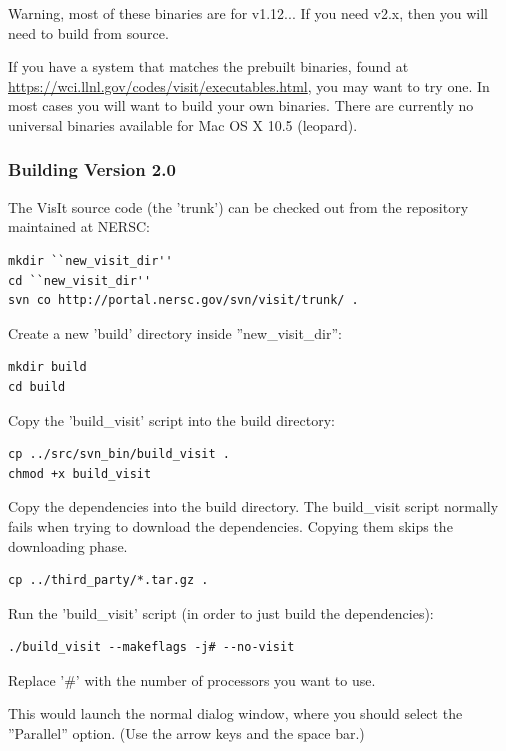 \documentclass[12pt]{article}
\begin{document}
Warning, most of these binaries are for v1.12... If you need v2.x, then you
will need to build from source.

If you have a system that matches the prebuilt binaries, found at
\url{https://wci.llnl.gov/codes/visit/executables.html}, you may want
to try one. In most cases you will want to build your own
binaries. There are currently no universal binaries available for Mac
OS X 10.5 (leopard).

\subsubsection{Building Version 2.0}
\label{subsec:VisItVersion2_Build}

The VisIt source code (the 'trunk') can be checked out from the
repository maintained at NERSC:

\begin{verbatim}
mkdir ``new_visit_dir''
cd ``new_visit_dir'' 
svn co http://portal.nersc.gov/svn/visit/trunk/ .
\end{verbatim}

Create a new 'build' directory inside ''new\_visit\_dir'':

\begin{verbatim}
mkdir build
cd build
\end{verbatim}

Copy the 'build\_visit' script into the build directory:

\begin{verbatim}
cp ../src/svn_bin/build_visit .
chmod +x build_visit
\end{verbatim}

Copy the dependencies into the build directory. The build\_visit script
normally fails when trying to download the dependencies.  Copying them
skips the downloading phase.

\begin{verbatim}
cp ../third_party/*.tar.gz .
\end{verbatim}

Run the 'build\_visit' script (in order to just build the dependencies):

\begin{verbatim}
./build_visit --makeflags -j# --no-visit
\end{verbatim}

Replace '\#' with the number of processors you want to use.

This would launch the normal dialog window, where you should select
the ''Parallel'' option.  (Use the arrow keys and the space bar.)
\end{document}
